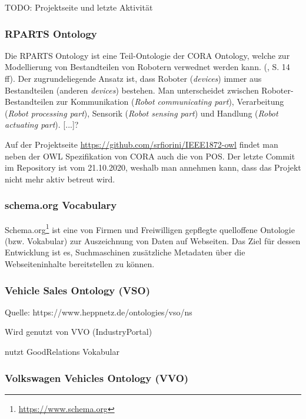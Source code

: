\documentclass{article}
\begin{document}
TODO: Projektseite und letzte Aktivität

\subsubsection{RPARTS Ontology}


Die RPARTS Ontology ist eine Teil-Ontologie der CORA Ontology, welche zur Modellierung von Bestandteilen von Robotern verwednet werden kann. (\cite{fiorini2015extensions}, S. 14 ff).
Der zugrundeliegende Ansatz ist, dass Roboter (\textit{devices}) immer aus Bestandteilen (anderen \textit{devices}) bestehen.
Man unterscheidet zwischen Roboter-Bestandteilen zur Kommunikation (\textit{Robot communicating part}), Verarbeitung (\textit{Robot processing part}), Sensorik (\textit{Robot sensing part}) und Handlung (\textit{Robot actuating part}).
[...]?

Auf der Projektseite \url{https://github.com/srfiorini/IEEE1872-owl} findet man neben der OWL Spezifikation von CORA auch die von POS. Der letzte Commit im Repository ist vom 21.10.2020, weshalb man annehmen kann, dass das Projekt nicht mehr aktiv betreut wird.

\subsubsection{schema.org Vocabulary}

Schema.org\footnote{\url{https://www.schema.org}} ist eine von Firmen und Freiwilligen gepflegte quelloffene Ontologie (bzw. Vokabular) zur Auszeichnung von Daten auf Webseiten.
Das Ziel für dessen Entwicklung ist es, Suchmaschinen zusätzliche Metadaten über die Webseiteninhalte bereitstellen zu können.

\subsubsection{Vehicle Sales Ontology (VSO)}

Quelle: https://www.heppnetz.de/ontologies/vso/ns

Wird genutzt von VVO (IndustryPortal)

nutzt GoodRelations Vokabular

\subsubsection{Volkswagen Vehicles Ontology (VVO)}
\end{document}
